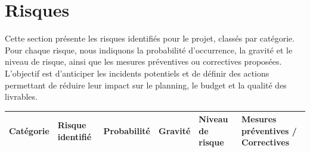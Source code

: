 \section{Risques}
Cette section présente les risques identifiés pour le projet, classés par catégorie. Pour chaque risque, nous indiquons la probabilité d'occurrence, la gravité et le niveau de risque, ainsi que les mesures préventives ou correctives proposées. L'objectif est d'anticiper les incidents potentiels et de définir des actions permettant de réduire leur impact sur le planning, le budget et la qualité des livrables.

\vspace{1cm}
\setlength{\headheight}{25pt}
\begin{table}[h!]
   \renewcommand{\arraystretch}{1} %
   \begin{tabularx}{\textwidth}{|p{2cm}|p{3.2cm}|p{2.6cm}|p{2cm}|p{2cm}|p{3cm}|}
      \hline
      \textbf{Catégorie} & \textbf{Risque identifié}                      & \textbf{Probabilité} & \textbf{Gravité} & \textbf{Niveau de risque} & \textbf{Mesures préventives / Correctives}                  \\
      \hline

\end{tabularx}
\end{table}
